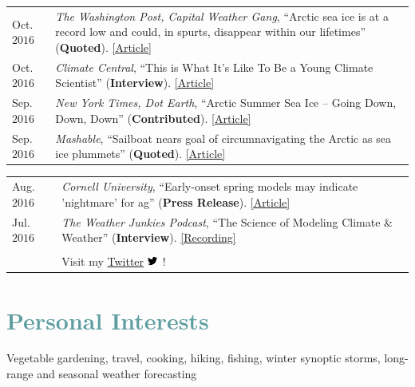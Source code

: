\documentclass[margin,line,palatino,courier,10pt]{res}
\begin{document}
\begin{resume}
\begin{tabular}{@{}p{0.8in}p{4in}}
Oct. $2016$ & \textit{The Washington Post, Capital Weather Gang}, ``Arctic sea ice is at a record low and could, in spurts, disappear within our lifetimes'' (\textbf{Quoted}). \href{https://www.washingtonpost.com/news/capital-weather-gang/wp/2016/10/27/arctic-sea-ice-is-at-a-record-low-and-could-in-spurts-disappear-within-our-lifetimes/}{[Article]}\\
Oct. $2016$ & \textit{Climate Central}, ``This is What It's Like To Be a Young Climate Scientist'' (\textbf{Interview}). \href{http://www.climatecentral.org/news/young-climate-scientists-interviews-20799}{[Article]}\\
Sep. $2016$ & \textit{New York Times, Dot Earth}, ``Arctic Summer Sea Ice -- Going Down, Down, Down'' (\textbf{Contributed}). \href{http://dotearth.blogs.nytimes.com/2016/09/16/arctic-summer-sea-ice-going-down-down-down/?module=BlogPost-ReadMore&version=Blog\%20Main&action=Click&contentCollection=arctic&pgtype=Blogs&region=Body&_r=1#more-58318}{[Article]}\\
Sep. $2016$ & \textit{Mashable}, ``Sailboat nears goal of circumnavigating the Arctic as sea ice plummets'' (\textbf{Quoted}). \href{http://mashable.com/2016/09/01/sailboat-arctic-ice-melt-open-water/#s7nzft8m6sqB}{[Article]}\\
\end{tabular}
\begin{tabular}{@{}p{0.8in}p{4in}}
Aug. $2016$ & \textit{Cornell University}, ``Early-onset spring models may indicate 'nightmare' for ag'' (\textbf{Press Release}). \href{http://www.news.cornell.edu/stories/2016/08/early-onset-spring-models-may-indicate-nightmare-ag}{[Article]}\\
Jul. $2016$ & \textit{The Weather Junkies Podcast}, ``The Science of Modeling Climate \& Weather'' (\textbf{Interview}). \href{https://www.youtube.com/watch?v=vgT5P9zC91U}{[Recording]}\\\\

& Visit my \href{https://twitter.com/ZLabe}{Twitter} \includegraphics[height=9pt]{twitter.png}\ !\\
\end{tabular}


\vspace{-0.1in}
\noindent\makebox[\linewidth][r]{\rule{\textwidth}{5pt}}
\vspace{-0.3in}
\section{\sc \textcolor{CadetBlue}{\large{Personal Interests}}}
Vegetable gardening, travel, cooking, hiking, fishing, winter synoptic storms, long-range and seasonal weather forecasting

\end{resume}
\end{document}
